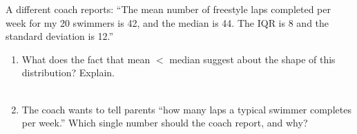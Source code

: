 \documentclass[10pt]{article}
\begin{document}
\vspace{0.10in}

\noindent\small A different coach reports: ``The mean number of freestyle laps
completed per week for my 20 swimmers is 42, and the median is 44. The IQR is 8
and the standard deviation is 12.''

\begin{enumerate}[leftmargin=1.5em, itemsep=8pt, resume]

  \item What does the fact that mean $<$ median suggest about the shape of this
        distribution? Explain.\\[5pt]
        \writeline\\[1pt]\writeline

  \item The coach wants to tell parents ``how many laps a typical swimmer
        completes per week.'' Which single number should the coach report,
        and why?\\[5pt]
        \writeline\\[1pt]\writeline

\end{enumerate}
\end{document}
